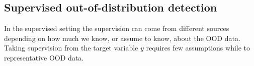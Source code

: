 \subsection{Supervised out-of-distribution detection}
%
%
In the supervised setting the supervision can come from different sources depending on how much we know, or assume to know, about the OOD data. Taking supervision from the target variable $y$ requires few assumptions while to representative OOD data. 

